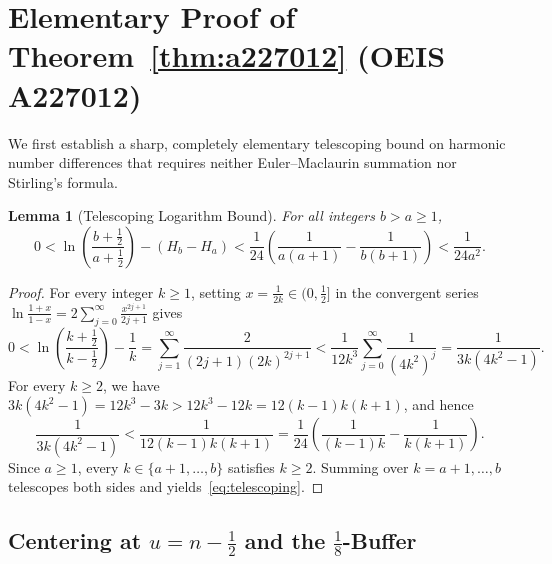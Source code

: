 \documentclass[11pt,a4paper]{article}
\newtheorem{lemma}[theorem]{Lemma}
\theoremstyle{remark}
\begin{document}
\section{Elementary Proof of Theorem~\ref{thm:a227012} (OEIS A227012)}

We first establish a sharp, completely elementary telescoping bound on harmonic number differences that requires neither Euler--Maclaurin summation nor Stirling's formula.

\begin{lemma}[Telescoping Logarithm Bound]\label{lem:harmonic-bound}
For all integers $b > a \ge 1$,
\begin{equation}\label{eq:telescoping}
  0 < \ln\!\left(\frac{b + \frac{1}{2}}{a + \frac{1}{2}}\right) - (H_b - H_a) < \frac{1}{24}\!\left(\frac{1}{a(a+1)} - \frac{1}{b(b+1)}\right) < \frac{1}{24a^2}.
\end{equation}
\end{lemma}

\begin{proof}
For every integer $k \ge 1$, setting $x = \frac{1}{2k} \in (0, \frac{1}{2}]$ in the convergent series $\ln\frac{1+x}{1-x} = 2\sum_{j=0}^{\infty} \frac{x^{2j+1}}{2j+1}$ gives
\[
  0 < \ln\!\left(\frac{k + \frac{1}{2}}{k - \frac{1}{2}}\right) - \frac{1}{k} = \sum_{j=1}^{\infty} \frac{2}{(2j+1)(2k)^{2j+1}} < \frac{1}{12k^3} \sum_{j=0}^{\infty} \frac{1}{(4k^2)^j} = \frac{1}{3k(4k^2 - 1)}.
\]
For every $k \ge 2$, we have $3k(4k^2 - 1) = 12k^3 - 3k > 12k^3 - 12k = 12(k-1)k(k+1)$, and hence
\[
  \frac{1}{3k(4k^2 - 1)} < \frac{1}{12(k-1)k(k+1)} = \frac{1}{24}\!\left(\frac{1}{(k-1)k} - \frac{1}{k(k+1)}\right).
\]
Since $a \ge 1$, every $k \in \{a+1, \dots, b\}$ satisfies $k \ge 2$. Summing over $k = a+1, \dots, b$ telescopes both sides and yields~\eqref{eq:telescoping}.
\end{proof}

\subsection{Centering at $u = n - \tfrac{1}{2}$ and the $\tfrac{1}{8}$-Buffer}
\end{document}

